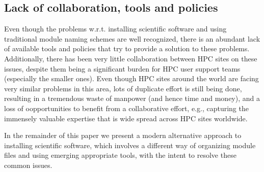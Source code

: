 
\subsection{Lack of collaboration, tools and policies}
\label{sec:traditional_lack}

Even though the problems w.r.t. installing scientific software and using
traditional module naming schemes are well recognized, there is an abundant lack
of available tools and policies that try to provide a solution to these problems.
Additionally, there has been very little collaboration between HPC sites on these
issues, despite them being a significant burden for HPC user support teams
(especially the smaller ones). Even though HPC sites around the world are facing
very similar problems in this area, lots of duplicate effort is still being done,
resulting in a tremendous waste of manpower (and hence time and money), and a loss
of oopportunities to benefit from a collaborative effort, e.g., capturing the
immensely valuable expertise that is wide spread across HPC sites worldwide.

In the remainder of this paper we present a modern alternative approach to
installing scientific software, which involves a different way of organizing
module files and using emerging appropriate tools, with the intent to resolve
these common issues.


